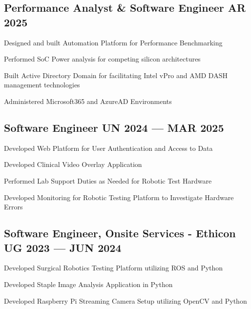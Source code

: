 \subsection{{Performance Analyst \& Software Engineer \texorpdfstring{\hfill} \texorpdfstring{\null} MAR 2025}}
\begin{zitemize}
\item Designed and built Automation Platform for Performance Benchmarking
\item Performed SoC Power analysis for competing silicon architectures
\item Built Active Directory Domain for facilitating Intel vPro and AMD DASH management technologies
\item Administered Microsoft365 and AzureAD Environments
\end{zitemize}

\subsection{{Software Engineer \texorpdfstring{\hfill} \texorpdfstring{\null} JUN 2024 --- MAR 2025}}
\begin{zitemize}
\item Developed Web Platform for User Authentication and Access to Data
\item Developed Clinical Video Overlay Application
\item Performed Lab Support Duties as Needed for Robotic Test Hardware
\item Developed Monitoring for Robotic Testing Platform to Investigate Hardware Errors
\end{zitemize}

\subsection{{Software Engineer, Onsite Services - Ethicon \texorpdfstring{\hfill} \texorpdfstring{\null} AUG 2023 --- JUN 2024}}
\begin{zitemize}
\item Developed Surgical Robotics Testing Platform utilizing ROS and Python
\item Developed Staple Image Analysis Application in Python
\item Developed Raspberry Pi Streaming Camera Setup utilizing OpenCV and Python
\end{zitemize}

